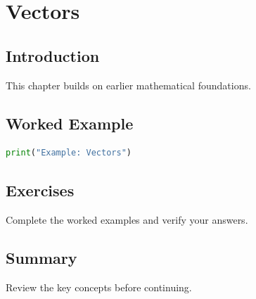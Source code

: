 \chapter{Vectors}
\label{chap:vol4-9}



\section{Introduction}
This chapter builds on earlier mathematical foundations.

\section{Worked Example}
\begin{lstlisting}[language=Python]
print("Example: Vectors")
\end{lstlisting}

\section{Exercises}
\begin{exercise}
Complete the worked examples and verify your answers.
\end{exercise}

\section{Summary}
Review the key concepts before continuing.
